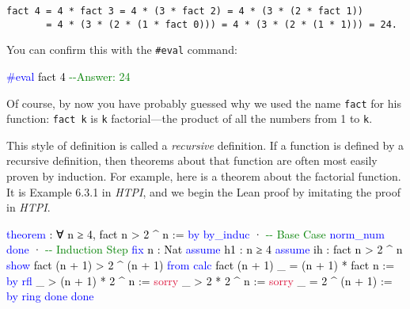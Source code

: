 \documentclass[
  letterpaper,
  DIV=11,
  numbers=noendperiod]{scrreprt}
\makeatletter
\newenvironment{Shaded}{\begin{snugshade}}{\end{snugshade}}
\newcommand{\AnnotationTok}[1]{\textcolor[rgb]{0.37,0.37,0.37}{#1}}
\newcommand{\CommentTok}[1]{\textcolor[rgb]{0.37,0.37,0.37}{#1}}
\newcommand{\ConstantTok}[1]{\textcolor[rgb]{0.56,0.35,0.01}{#1}}
\newcommand{\KeywordTok}[1]{\textcolor[rgb]{0.00,0.23,0.31}{#1}}
\newcommand{\NormalTok}[1]{\textcolor[rgb]{0.00,0.23,0.31}{#1}}
\newcommand{\SpecialCharTok}[1]{\textcolor[rgb]{0.37,0.37,0.37}{#1}}
\def\brownsquiggly{\bgroup \markoverwith{\textcolor[HTML]{B8860B}{\lower3.5\p@\hbox{\sixly \char58}}}\ULon}
\renewcommand{\NormalTok}[1]{\textcolor[HTML]{000000}{#1}}
\renewcommand{\KeywordTok}[1]{\textcolor[HTML]{0000FF}{#1}}
\renewcommand{\SpecialCharTok}[1]{}
\renewcommand{\CommentTok}[1]{\textcolor[HTML]{008000}{#1}}
\renewcommand{\ConstantTok}[1]{\textcolor[HTML]{DC143C}{#1}}
\renewcommand{\AnnotationTok}[1]{\brownsquiggly{#1}}
\newenvironment{ind}
	{\begin{list}{}{\setlength{\leftmargin}{1em}}\item\relax}
	{\end{list}}
\theoremstyle{remark}
\makeatother
\begin{document}
\begin{ind}

\begin{verbatim}
fact 4 = 4 * fact 3 = 4 * (3 * fact 2) = 4 * (3 * (2 * fact 1))
       = 4 * (3 * (2 * (1 * fact 0))) = 4 * (3 * (2 * (1 * 1))) = 24.
\end{verbatim}

\end{ind}

You can confirm this with the \texttt{\#eval} command:

\begin{Shaded}
\begin{Highlighting}[]
\KeywordTok{\#eval}\NormalTok{ fact 4   }\CommentTok{{-}{-}Answer: 24}
\end{Highlighting}
\end{Shaded}

Of course, by now you have probably guessed why we used the name
\texttt{fact} for his function: \texttt{fact\ k} is \texttt{k}
factorial---the product of all the numbers from 1 to \texttt{k}.

This style of definition is called a \emph{recursive} definition. If a
function is defined by a recursive definition, then theorems about that
function are often most easily proven by induction. For example, here is
a theorem about the factorial function. It is Example 6.3.1 in
\emph{HTPI}, and we begin the Lean proof by imitating the proof in
\emph{HTPI}.

\begin{Shaded}
\begin{Highlighting}[]
\KeywordTok{theorem} \SpecialCharTok{??}\AnnotationTok{Example\_6\_3\_1}\SpecialCharTok{::}\NormalTok{ : ∀ n ≥ 4, fact n \textgreater{} 2 \^{} n := }\KeywordTok{by}
  \KeywordTok{by\_induc}
\NormalTok{  · }\CommentTok{{-}{-} Base Case}
    \KeywordTok{norm\_num}
    \KeywordTok{done}
\NormalTok{  · }\CommentTok{{-}{-} Induction Step}
    \KeywordTok{fix}\NormalTok{ n : Nat}
    \KeywordTok{assume}\NormalTok{ h1 : n ≥ 4}
    \KeywordTok{assume}\NormalTok{ ih : fact n \textgreater{} 2 \^{} n}
    \KeywordTok{show}\NormalTok{ fact (n + 1) \textgreater{} 2 \^{} (n + 1) }\KeywordTok{from}
      \KeywordTok{calc}\NormalTok{ fact (n + 1)}
\NormalTok{        \_ = (n + 1) * fact n := }\KeywordTok{by} \KeywordTok{rfl}
\NormalTok{        \_ \textgreater{} (n + 1) * 2 \^{} n := }\ConstantTok{sorry}
\NormalTok{        \_ \textgreater{} 2 * 2 \^{} n := }\ConstantTok{sorry}
\NormalTok{        \_ = 2 \^{} (n + 1) := }\KeywordTok{by} \KeywordTok{ring}
    \KeywordTok{done}
  \KeywordTok{done}
\end{Highlighting}
\end{Shaded}
\end{document}
